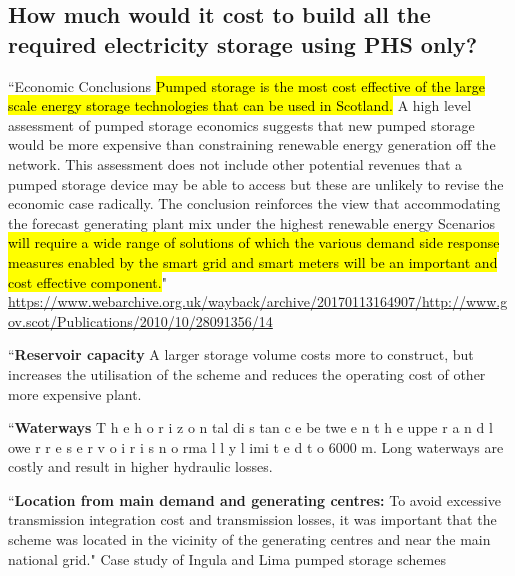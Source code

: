 
\subsection{How much would it cost to build all the required electricity storage using PHS only?}

``Economic Conclusions
\hl{Pumped storage is the most cost effective of the large scale energy storage technologies that can be
used in Scotland.} A high level assessment of pumped storage economics suggests that new pumped
storage would be more expensive than constraining renewable energy generation off the network.
This assessment does not include other potential revenues that a pumped storage device may be able
to access but these are unlikely to revise the economic case radically. The conclusion reinforces the
view that accommodating the forecast generating plant mix under the highest renewable energy
Scenarios \hl{will require a wide range of solutions of which the various demand side response measures
enabled by the smart grid and smart meters will be an important and cost effective component.}"
\url{https://www.webarchive.org.uk/wayback/archive/20170113164907/http://www.gov.scot/Publications/2010/10/28091356/14}

``\textbf{Reservoir capacity}
A
larger storage volume costs more to construct, but increases
the utilisation of the scheme and reduces the operating cost of
other more expensive plant.

``\textbf{Waterways}
T h e h o r i z o n tal di s tan c e be twe e n t h e uppe r
a n d l owe r r e s e r v o i r i s n o rma l l y l imi t e d t o
6000 m. Long waterways are costly and result in higher
hydraulic losses.

``\textbf{Location from main demand and generating
centres:} To avoid excessive transmission integration
cost and transmission losses, it was important that the
scheme was located in the vicinity of the generating
centres and near the main national grid."
Case study of Ingula and Lima pumped storage schemes